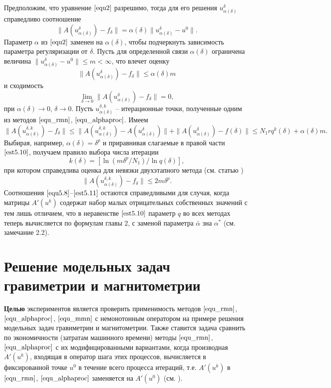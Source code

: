 Предположим, что уравнение $\eqref{equ2}$ разрешимо, тогда для его решения $u_{\alpha(\delta)}^{\delta}$ справедливо соотношение
\begin{equation}\label{equ5.8}
\|A(u_{\alpha(\delta)}^{\delta})-f_\delta\|=\alpha(\delta)\|u_{\alpha(\delta)}^{\delta}-u^0\|.
\end{equation}
Параметр $\alpha$ из $\eqref{equ2}$ заменен на $\alpha(\delta)$, чтобы подчеркнуть зависимость параметра регуляризации от $\delta$.
Пусть для определенной связи $\alpha(\delta)$ ограничена величина $\|u_{\alpha(\delta)}^{\delta}-u^0\|\le m <\infty$, что влечет оценку
\begin{equation}\label{est5.9}
\|A(u_{\alpha(\delta)}^{\delta})-f_\delta\|\le\alpha(\delta)m
\end{equation}
и сходимость $$\lim_{\delta\to 0}\|A(u_{\alpha(\delta)}^{\delta})-f_\delta\|=0,$$ при $\alpha(\delta)\to 0$, $\delta\to 0$. Пусть ${u_{\alpha(\delta)}^{\delta, k}}$ -- итерационные точки, полученные одним из методов $\eqref{equ_rmn}$, $\eqref{equ_alphaproc}$. Имеем
\begin{equation}\label{est5.10}
\|A(u_{\alpha(\delta)}^{\delta, k})-f_\delta\|\le\|A(u_{\alpha(\delta)}^{\delta, k})-A(u_{\alpha(\delta)}^{\delta})\|+\|A(u_{\alpha(\delta)}^{\delta})-f(\delta)\|\le N_1 r q^k(\delta)+\alpha(\delta)m.
\end{equation}
Выбирая, например, $\alpha(\delta)=\delta^p$ и приравнивая слагаемые в правой части $\eqref{est5.10}$, получаем правило выбора числа итерации
$$k(\delta)=\left [\ln(m\delta^p/N_1)/\ln q(\delta)\right ],$$
при котором справедлива оценка для невязки двухэтапного метода (см. статью \cite{VasSkur2017})
\begin{equation}\label{est5.11}
\|A(u_{\alpha(\delta)}^{\delta,k})-f_\delta\|\le 2m\delta^p.
\end{equation}
{\remark Соотношения $\eqref{equ5.8}$--$\eqref{est5.11}$ остаются справедливыми для случая, когда матрицы $A'(u^k)$ содержат набор малых отрицательных собственных значений с тем лишь отличием, что в неравенстве $\eqref{est5.10}$ параметр $q$ во всех методах теперь вычисляется по формулам главы 2, с заменой параметра $\bar\alpha$ зна $\alpha^*$ (см. замечание 2.2).}

\newpage
\section{Решение модельных задач гравиметрии и магнитометрии}

{\bfseries Целью} экспериментов является проверить применимость методов $\eqref{equ_rmn}$, $\eqref{equ_alphaproc}$, $\eqref{equ_mmn}$ с немонотонным оператором на примере решения модельных задач гравиметрии и магнитометрии. Также ставится задача сравнить по экономичности (затратам машинного времени) методы $\eqref{equ_rmn}$, $\eqref{equ_alphaproc}$ с их модифицированными вариантами, когда производная $A'(u^k)$, входящая в оператор шага этих процессов, вычисляется в фиксированной точке $u^0$ в течение всего процесса итераций, т.е. $A'(u^k)$ в $\eqref{equ_rmn}$, $\eqref{equ_alphaproc}$ заменяется на $A'(u^0)$ (см. \cite{Vasin2014, Vasin2016}). 

